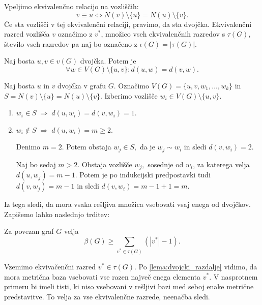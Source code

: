 \documentclass[mat1, tisk]{fmfdelo}
\newcommand{\1}{(1, 1, \ldots, 1)}
\newcommand{\2}{(2, 2, \ldots, 2)}
\begin{document}
Vpeljimo ekvivalenčno relacijo na vozliščih:
\begin{equation}\label{eq:dvojcki}
v \equiv u \Leftrightarrow N(v)\setminus \{u\} = N(u) \setminus \{v\}.
\end{equation}
Če sta vozlišči v tej ekvivalenčni relaciji, pravimo, da sta dvojčka. 
Ekvivalenčni razred vozlišča $v$ označimo z $v^{*}$, 
množico vseh ekvivalenčnih razredov s $\tau (G)$, število vseh razredov pa naj bo označeno 
z $\iota(G) = |\tau(G)|.$


\begin{lema} \label{lema:dvojcki_razdalje}
    Naj bosta $u, v \in v(G)$ dvojčka. Potem je 
    $$\forall w \in V(G) \setminus \{u, v\} : d(u, w) = d(v, w).$$
\end{lema}

\begin{dokaz}
    Naj bosta $u$ in $v$ dvojčka v grafu $G$. Označimo $V(G) = \{u, v, w_1, \ldots, w_k\}$ 
    in $S = N(v)\setminus \{u\} = N(u) \setminus \{v\}$. Izberimo vozlišče 
    $w_i \in V(G) \setminus \{u, v\}.$
    \begin{enumerate}
        \item $w_i \in S \; \Rightarrow \; d(u, w_i) = d(v, w_i) = 1.$
        \item $w_i \notin S \; \Rightarrow \; d(u, w_i) = m \geq 2$. 
    
        Denimo $m=2.$ Potem obstaja $w_j \in S,$ da je $w_j \sim w_i$ in sledi $d(v, w_i) = 2.$
        
        Naj bo sedaj $m > 2.$ Obstaja vozlišče $w_j,$ sosednje od $w_i$, za katerega velja 
        $d(u, w_j) = m-1.$ Potem je po indukcijski predpostavki tudi $d(v, w_j) = m-1$ in 
        sledi $d(v, w_i) = m-1 + 1 = m.$
    \end{enumerate}
\end{dokaz}

Iz tega sledi, da mora vsaka rešljiva množica vsebovati vsaj enega od dvojčkov.
Zapišemo lahko naslednjo trditev:

\begin{trditev} \label{trd:meja_mdim_dvojcki}
    Za povezan graf $G$ velja
    $$\beta(G) \geq \sum_{v^{*} \in \tau(G)} (|v^{*}| - 1).$$
\end{trditev}

\begin{dokaz}
    Vzemimo ekvivačenčni razred $v^{*} \in \tau(G)$.
    Po \ref{lema:dvojcki_razdalje} vidimo, da mora metrična baza vsebovati vse razen 
    največ enega elementa $v^{*}$. V nasprotnem primeru bi imeli tisti, ki niso vsebovani v rešljivi 
    bazi med seboj enake metrične predstavitve.
    To velja za vse ekvivalenčne razrede, neenačba sledi. 
\end{dokaz}
\end{document}
